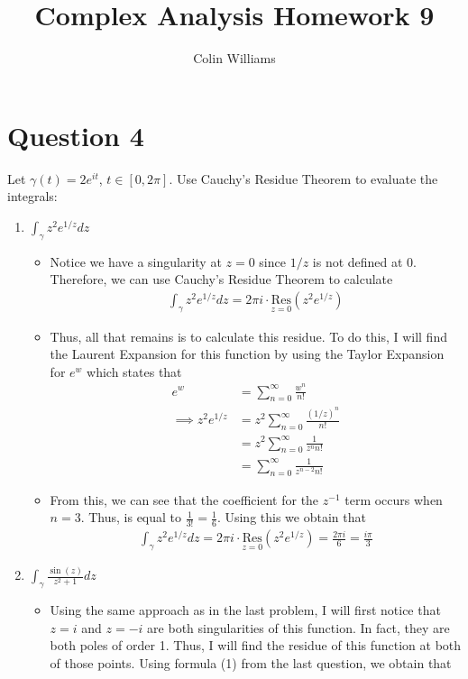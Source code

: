 \documentclass[10pt,a4paper]{article}
\title{Complex Analysis Homework 9}
\author{Colin Williams}
\theoremstyle{definition}
\begin{document}
\maketitle

\section*{Question 4}
Let $\gamma(t) = 2e^{it}$, $t \in [0, 2\pi]$. Use Cauchy's Residue Theorem to evaluate the integrals:
\begin{enumerate}[label = (\alph*)]
\item $\displaystyle \int_{\gamma} z^2 e^{1/z} dz$
	\begin{itemize}
	\item Notice we have a singularity at $z = 0$ since $1/z$ is not defined at 0. Therefore, we can use Cauchy's Residue Theorem to calculate
	\begin{align*}
	\int_{\gamma} z^2e^{1/z} dz = 2\pi i \cdot \underset{z = 0}{\text{Res}}\left(z^2e^{1/z}\right)
	\end{align*}
	\item Thus, all that remains is to calculate this residue. To do this, I will find the Laurent Expansion for this function by using the Taylor Expansion for $e^w$ which states that
	\begin{align*}
	e^w &= \sum_{n = 0}^{\infty} \frac{w^n}{n!}\\
	\implies z^2e^{1/z} &= z^2 \sum_{n = 0}^{\infty} \frac{(1/z)^n}{n!}\\
	&= z^2 \sum_{n = 0}^{\infty} \frac{1}{z^nn!}\\
	&= \sum_{n = 0}^{\infty} \frac{1}{z^{n - 2}n!}
	\end{align*}
	\item From this, we can see that the coefficient for the $z^{-1}$ term occurs when $n = 3$. Thus, is equal to $\frac{1}{3!} = \frac{1}{6}$. Using this we obtain that 
	\begin{align*}
	\int_{\gamma} z^2e^{1/z} dz = 2\pi i \cdot \underset{z = 0}{\text{Res}}\left(z^2e^{1/z}\right) = \frac{2\pi i}{6} = \boxed{\frac{i \pi}{3}}
	\end{align*}
	\end{itemize}
\item $\displaystyle \int_{\gamma} \frac{\sin(z)}{z^2 + 1}dz$
	\begin{itemize}
	\item Using the same approach as in the last problem, I will first notice that $z = i$ and $z = -i$ are both singularities of this function. In fact, they are both poles of order 1. Thus, I will find the residue of this function at both of those points. Using formula (1) from the last question, we obtain that 

\end{itemize}
\end{enumerate}
\end{document}

